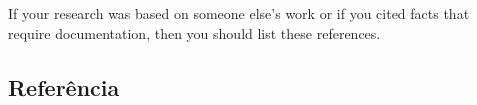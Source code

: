 

If your research was based on someone else's work or if you cited facts that require documentation, then you should list these references.

\subsection{Referência}
\label{references}


